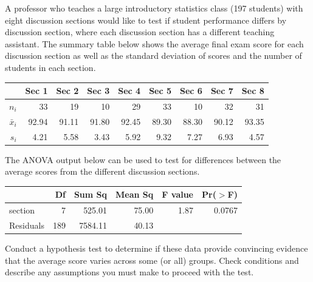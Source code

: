 \begin{problem}




\end{problem}


\begin{problem}
    A professor who teaches a large introductory statistics class (197 students) with eight discussion sections would like to test if student performance differs by discussion section, where each discussion section has a different teaching assistant. The summary table below shows the average final exam score for each discussion section as well as the standard deviation of scores and the number of students in each section.
\begin{center}
\begin{tabular}{rrrrrrrrr}
  \hline
 			& Sec 1 & Sec 2 & Sec 3 & Sec 4 & Sec 5 & Sec 6 & Sec 7 & Sec 8 \\ 
  \hline
$n_i$		& 33 & 19 & 10 & 29 & 33 & 10 & 32 & 31 \\ 
$\bar{x}_i$	& 92.94 & 91.11 & 91.80 & 92.45 & 89.30 & 88.30 & 90.12 & 93.35 \\ 
$s_i$ 		& 4.21 & 5.58 & 3.43 & 5.92 & 9.32 & 7.27 & 6.93 & 4.57 \\ 
   \hline
\end{tabular}
\end{center}
The ANOVA output below can be used to test for differences between the average scores from the different discussion sections.
\begin{center}
\begin{tabular}{lrrrrr}
\hline
 			& Df 		& Sum Sq & Mean Sq 	& F value & Pr($>$F) \\ 
\hline
section 		& 7 		& 525.01 	& 75.00 		& 1.87 	& 0.0767 \\ 
Residuals 	& 189	& 7584.11	& 40.13 		&  		&  \\ 
\hline
\end{tabular}
\end{center}
Conduct a hypothesis test to determine if these data provide convincing evidence that the average score varies across some (or all) groups. Check conditions and describe any assumptions you must make to proceed with the test.
\end{problem}


